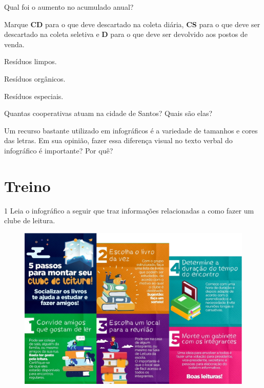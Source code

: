 \begin{conteudo}
\begin{conteudo}
\begin{conteudo}
\begin{conteudo}
\begin{escolha}
\item Qual foi o aumento no acumulado anual?

\item Marque \textbf{CD} para o que deve descartado na coleta diária,
\textbf{CS} para o que deve ser descartado na coleta seletiva e \textbf{D}
para o que deve ser devolvido aos postos de venda.

\begin{boxlist}
 Resíduos limpos.

 Resíduos orgânicos.

 Resíduos especiais.
\end{boxlist}

\item Quantas cooperativas atuam na cidade de Santos? Quais são elas?
\item{}

\item Um recurso bastante utilizado em infográficos é a variedade de
tamanhos e cores das letras. Em sua opinião, fazer essa diferença visual
no texto verbal do infográfico é importante? Por quê?

\item {}
\end{escolha}

\section{Treino}

\num{1} Leia o infográfico a seguir que traz informações relacionadas a
como fazer um clube de leitura.

\begin{figure}[htpb!]
\centering
\includegraphics[width=\textwidth]{media/image32.png}
\end{figure}


\end{conteudo}
\end{conteudo}
\end{conteudo}
\end{conteudo}

